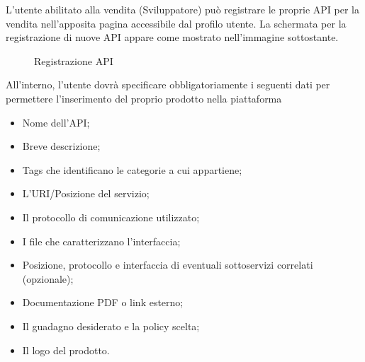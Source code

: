 L'utente abilitato alla vendita (Sviluppatore) può  registrare le proprie API per la vendita nell'apposita pagina accessibile dal profilo utente. La schermata per la registrazione di nuove API appare come mostrato nell'immagine sottostante.

\label{Registrazione API}
\begin{figure}[H]
	\centering
	\caption{Registrazione API}
\end{figure}

All'interno, l'utente dovrà specificare obbligatoriamente i seguenti dati per permettere l'inserimento del proprio prodotto nella piattaforma

\begin{itemize}
	\item Nome dell'API;
	\item Breve descrizione;
	\item Tags che identificano le categorie a cui appartiene;
	\item L'URI/Posizione del servizio;
	\item Il protocollo di comunicazione utilizzato;
	\item I file che caratterizzano l'interfaccia;
	\item Posizione, protocollo e interfaccia di eventuali sottoservizi correlati (opzionale);
	\item Documentazione PDF o link esterno;
	\item Il guadagno desiderato e la policy scelta;
	\item Il logo del prodotto.
\end{itemize}

